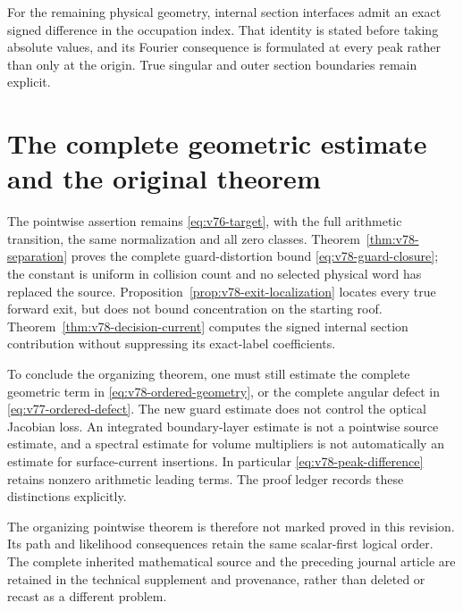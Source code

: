 \documentclass[11pt,reqno]{amsart}
\numberwithin{equation}{section}
\theoremstyle{definition}\newtheorem{definition}[theorem]{Definition}
\theoremstyle{remark}\newtheorem{remark}[theorem]{Remark}
\theoremstyle{definition}\newtheorem{inputstatement}[theorem]{Input statement}
\begin{document}
For the remaining physical geometry, internal section interfaces
admit an exact signed difference in the occupation index. That
identity is stated before taking absolute values, and its Fourier
consequence is formulated at every peak rather than only at the
origin. True singular and outer section boundaries remain explicit.









\section{The complete geometric estimate and the original theorem}
The pointwise assertion remains \eqref{eq:v76-target}, with the full
arithmetic transition, the same normalization and all zero classes.
Theorem~\ref{thm:v78-separation} proves the complete guard-distortion
bound \eqref{eq:v78-guard-closure}; the constant is uniform in collision
count and no selected physical word has replaced the source.
Proposition~\ref{prop:v78-exit-localization} locates every true forward
exit, but does not bound concentration on the starting roof.
Theorem~\ref{thm:v78-decision-current} computes the signed internal
section contribution without suppressing its exact-label coefficients.

To conclude the organizing theorem, one must still estimate the
complete geometric term in \eqref{eq:v78-ordered-geometry}, or the
complete angular defect in \eqref{eq:v77-ordered-defect}. The new
guard estimate does not control the optical Jacobian loss. An
integrated boundary-layer estimate is not a pointwise source estimate,
and a spectral estimate for volume multipliers is not automatically
an estimate for surface-current insertions. In particular
\eqref{eq:v78-peak-difference} retains nonzero arithmetic leading
terms. The proof ledger records these distinctions explicitly.

The organizing pointwise theorem is therefore not marked proved in
this revision. Its path and likelihood consequences retain the same
scalar-first logical order. The complete inherited mathematical
source and the preceding journal article are retained in the technical
supplement and provenance, rather than deleted or recast as a different
problem.
\end{document}
